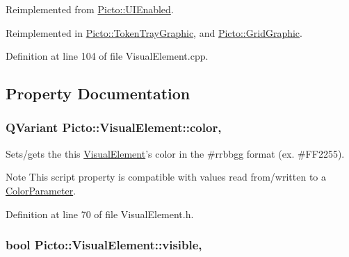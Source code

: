 Reimplemented from \hyperlink{class_picto_1_1_u_i_enabled_a12c0d0357c85854db9220c72c4941b15}{Picto\-::\-U\-I\-Enabled}.



Reimplemented in \hyperlink{class_picto_1_1_token_tray_graphic_a5ec79aa5e8ba418a86fccff306788b25}{Picto\-::\-Token\-Tray\-Graphic}, and \hyperlink{class_picto_1_1_grid_graphic_a1e597bb8d934abcc95dad8e47e102b56}{Picto\-::\-Grid\-Graphic}.



Definition at line 104 of file Visual\-Element.\-cpp.



\subsection{Property Documentation}
\hypertarget{struct_picto_1_1_visual_element_a45c3042c969717eb2ab60373369c7de7}{
\subsubsection[{color}]{\setlength{\rightskip}{0pt plus 5cm}Q\-Variant Picto\-::\-Visual\-Element\-::color\hspace{0.3cm}{\ttfamily [read]}, {\ttfamily [write]}}}\label{struct_picto_1_1_visual_element_a45c3042c969717eb2ab60373369c7de7}


Sets/gets the this \hyperlink{struct_picto_1_1_visual_element}{Visual\-Element}'s color in the \#rrbbgg format (ex. \#\-F\-F2255). 

\begin{DoxyNote}{Note}
This script property is compatible with values read from/written to a \hyperlink{class_picto_1_1_color_parameter}{Color\-Parameter}. 
\end{DoxyNote}


Definition at line 70 of file Visual\-Element.\-h.

\hypertarget{struct_picto_1_1_visual_element_a81a6de4e406cc6e3d8c7ac6398334d6c}{
\subsubsection[{visible}]{\setlength{\rightskip}{0pt plus 5cm}bool Picto\-::\-Visual\-Element\-::visible\hspace{0.3cm}{\ttfamily [read]}, {\ttfamily [write]}}}\label{struct_picto_1_1_visual_element_a81a6de4e406cc6e3d8c7ac6398334d6c}


